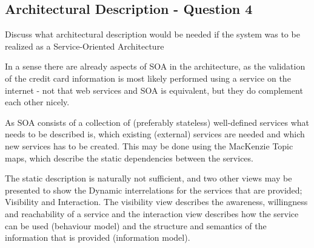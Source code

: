 \subsection{Architectural Description - Question 4}
\label{sec:ad_q4}
\begin{question}
Discuss what architectural description would be needed if
the system was to be realized as a Service-Oriented Architecture
\end{question}

In a sense there are already aspects of SOA in the architecture, as the validation of the credit card information is most likely performed using a service on the internet - not that web services and SOA is equivalent, but they do complement each other nicely.

As SOA consists of a collection of (preferably stateless) well-defined services what needs to be described is, which existing (external) services are needed and which new services has to be created. This may be done using the MacKenzie Topic maps, which describe the static dependencies between the services.

The static description is naturally not sufficient, and two other views may be presented to show the Dynamic interrelations for the services that are provided; Visibility and Interaction. The visibility view describes the awareness, willingness and reachability of a service and the interaction view describes how the service can be used (behaviour model) and the structure and semantics of the information that is provided (information model).

